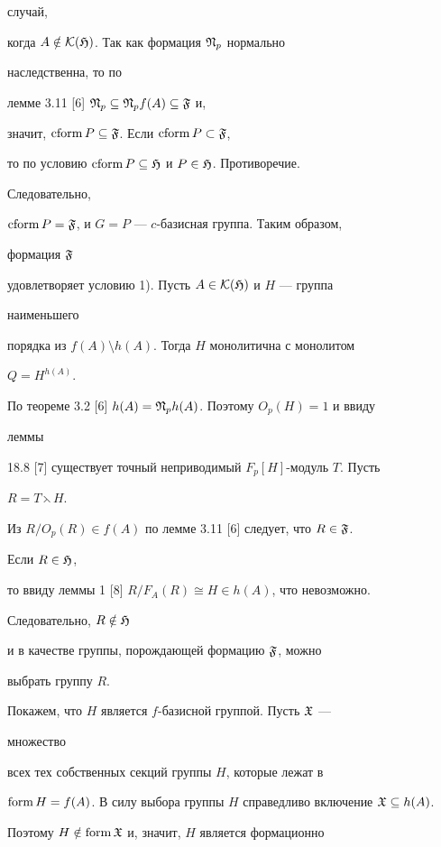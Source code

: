 \begin{pf}
случай, 


когда $A\notin\cal K(\frak H)$. Так как формация $\frak N_p$ нормально 


наследственна, то по 


лемме 3.11 [6] $\frak N_p\subseteq\frak N_p f(A)\subseteq\frak F$ и, 


значит, $\operatorname{cform} P\subseteq\frak F$. Если $\operatorname{cform} P\subset\frak F$, 


то по условию $\operatorname{cform} P\subseteq\frak H$ и $P\in\frak H$. Противоречие. 


Следовательно, 


$\operatorname{cform} P=\frak F$, и $G=P$ --- $c$-базисная группа. Таким образом, 


формация $\frak F$ 


удовлетворяет условию 1). Пусть $A\in\cal K(\frak H)$ и $H$ --- группа 


наименьшего 


порядка из $f(A)\setminus h(A)$. Тогда $H$ монолитична с монолитом 


$Q=H^{h(A)}$. 


По теореме 3.2 [6] $h(A)=\frak N_p h(A)$. Поэтому $O_p(H)=1$ и ввиду 


леммы 


18.8 [7] существует точный неприводимый $F_p[H]$-модуль $T$. Пусть 


$R=T\leftthreetimes H$. 


Из $R/O_p(R)\in f(A)$ по лемме 3.11 [6] следует, что $R\in\frak F$. 


Если $R\in\frak H$, 


то ввиду леммы 1 [8] $R/F_A(R)\cong H\in h(A)$, что невозможно. 


Следовательно, $R\notin\frak H$ 


и в качестве группы, порождающей формацию $\frak F$, можно 


выбрать группу $R$. 


 


Покажем, что $H$ является $f$-базисной группой. Пусть $\frak X$ --- 


множество 


всех тех собственных секций группы $H$, которые лежат в 


$\form H=f(A)$. В силу выбора группы $H$ справедливо включение $\frak 


X\subseteq h(A)$. 


Поэтому $H\notin\operatorname{form}\frak X$ и, значит, $H$ является формационно 



\end{pf}
